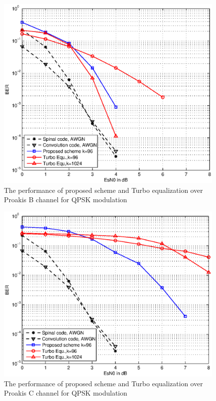 \documentclass[conference]{IEEEtran}
\begin{document}
\begin{figure}[ht]
\centering
\includegraphics[width=\columnwidth]{ChBQPSKComparison.eps}
\caption{The performance of proposed scheme and Turbo equalization over Proakis B channel for QPSK modulation}
\label{fig_ChBQPSKComparison}
\end{figure}
\begin{figure}[ht]
\centering
\includegraphics[width=\columnwidth]{ChCQPSKComparison.eps}
\caption{The performance of proposed scheme and Turbo equalization over Proakis C channel for QPSK modulation}
\label{fig_ChCQPSKComparison}
\end{figure}
\end{document}

